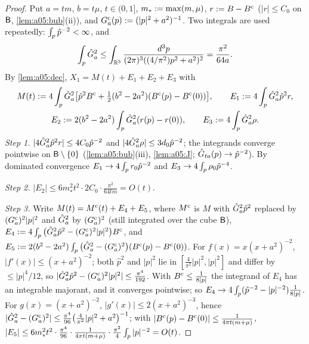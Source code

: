 \begin{proof}
Put $a=tm$, $b=t\mu$, $t\in(0,1]$, $m_*:=\max(m,\mu)$, $r:= B-B^{\mathrm c}$ ($|r|\le C_0$ on $\mathsf B$, \cref{lem:a05:bub}(ii)), and $G^{\rm c}_a(p):=(|p|^2+a^2)^{-1}$. Two integrals are used repeatedly: $\int_{p}\hat p^{-2}<\infty$, and
\[
\int_{p}\hat G_a^2\le\int_{\mathbb R^3}\frac{d^3p}{(2\pi)^3((4/\pi^2)p^2+a^2)^2}=\frac{\pi^2}{64a}.
\]
By \cref{lem:a05:dec}, $X_1=M(t)+E_1+E_2+E_3$ with
\begin{gather*}
M(t):=4\int_{p}\hat G_a^2\big[\hat p^2B^{\mathrm c}+\tfrac12(b^2-2a^2)(B^{\mathrm c}(p)-B^{\mathrm c}(0))\big],\qquad E_1:=4\int_{p}\hat G_a^2\hat p^2r,\\
E_2:=2(b^2-2a^2)\int_{p}\hat G_a^2(r(p)-r(0)),\qquad E_3:=4\int_{p}\hat G_a^2\rho .
\end{gather*}
\emph{Step 1.} $|4\hat G_a^2\hat p^2r|\le4C_0\hat p^{-2}$ and $|4\hat G_a^2\rho|\le3d_0\hat p^{-2}$; the integrands converge pointwise on $\mathsf B\setminus\{0\}$ (\cref{lem:a05:bub}(iii), \cref{lem:a05:J}; $\hat G_{ta}(p)\to\hat p^{-2}$). By dominated convergence $E_1\to4\int_{p} r_0\hat p^{-2}$ and $E_3\to4\int_{p}\rho_0\hat p^{-4}$.

\emph{Step 2.} $|E_2|\le6m_*^2t^2\cdot2C_0\cdot\frac{\pi^2}{64tm}=O(t)$.

\emph{Step 3.} Write $M(t)=M^{\rm c}(t)+E_4+E_5$, where $M^{\rm c}$ is $M$ with $\hat G_a^2\hat p^2$ replaced by $(G^{\rm c}_a)^2|p|^2$ and $\hat G_a^2$ by $(G^{\rm c}_a)^2$ (still integrated over the cube $\mathsf B$), $E_4:=4\int_{p}\big(\hat G_a^2\hat p^2-(G^{\rm c}_a)^2|p|^2\big)B^{\mathrm c}$, and $E_5:=2(b^2-2a^2)\int_{p}\big(\hat G_a^2-(G^{\rm c}_a)^2\big)(B^{\mathrm c}(p)-B^{\mathrm c}(0))$. For $f(x)=x(x+a^2)^{-2}$, $|f'(x)|\le(x+a^2)^{-2}$; both $\hat p^2$ and $|p|^2$ lie in $[\frac4{\pi^2}|p|^2,|p|^2]$ and differ by $\le|p|^4/12$, so $|\hat G_a^2\hat p^2-(G^{\rm c}_a)^2|p|^2|\le\frac{\pi^4}{192}$. With $B^{\mathrm c}\le\frac1{8|p|}$ the integrand of $E_4$ has an integrable majorant, and it converges pointwise; so $E_4\to4\int_{p}(\hat p^{-2}-|p|^{-2})\frac1{8|p|}$. For $g(x)=(x+a^2)^{-2}$, $|g'(x)|\le2(x+a^2)^{-3}$, hence $|\hat G_a^2-(G^{\rm c}_a)^2|\le\frac{\pi^4}{96}\big(\frac4{\pi^2}|p|^2+a^2\big)^{-1}$; with $|B^{\mathrm c}(p)-B^{\mathrm c}(0)|\le\frac1{4\pi t(m+\mu)}$, $|E_5|\le6m_*^2t^2\cdot\frac{\pi^4}{96}\cdot\frac1{4\pi t(m+\mu)}\cdot\frac{\pi^2}4\int_{p}|p|^{-2}=O(t)$.


\end{proof}
